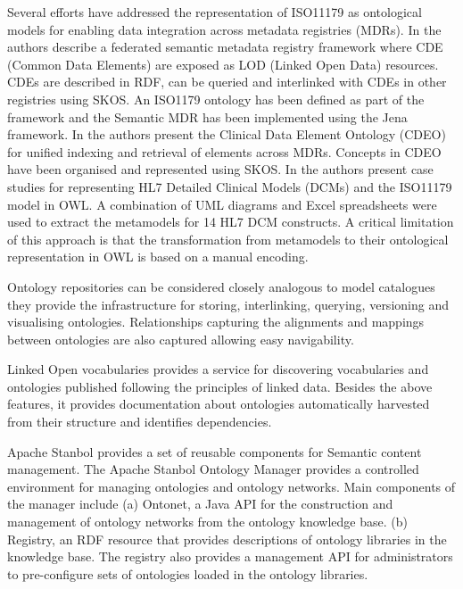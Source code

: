 


Several efforts have addressed the representation of ISO11179 as
ontological models for enabling data integration across metadata
registries (MDRs). In \cite{Sinaci2013784} the authors describe a
federated semantic metadata registry framework where CDE (Common Data
Elements) are exposed as LOD (Linked Open Data) resources. CDEs are
described in RDF, can be queried and interlinked with CDEs in other
registries using SKOS. An ISO1179 ontology has been defined as part of
the framework and the Semantic MDR has been implemented using the Jena
framework. In \cite{pmid25405066} the authors present the Clinical
Data Element Ontology (CDEO) for unified indexing and retrieval of
elements across MDRs. Concepts in CDEO have been organised and
represented using SKOS. In \cite{pmid22211181} the authors present
case studies for representing HL7 Detailed Clinical Models (DCMs) and
the ISO11179 model in OWL. A combination of UML diagrams and Excel
spreadsheets were used to extract the metamodels for 14 HL7 DCM
constructs. A critical limitation of this approach is that the
transformation from metamodels to their ontological representation in
OWL is based on a manual encoding.


Ontology repositories can be considered closely analogous to model
catalogues they provide the infrastructure for storing, interlinking,
querying, versioning and visualising ontologies. Relationships
capturing the alignments and mappings between ontologies are also
captured allowing easy navigability.

Linked Open vocabularies\cite{LOV} provides a service for discovering
vocabularies and ontologies published following the principles of
linked data. Besides the above features, it provides documentation
about ontologies automatically harvested from their structure and
identifies dependencies.

Apache Stanbol\cite{Stanbol} provides a set of reusable components for Semantic
content management.  The Apache Stanbol Ontology Manager provides a
controlled environment for managing ontologies and ontology
networks. Main components of the manager include (a) Ontonet, a Java
API for the construction and management of ontology networks from the
ontology knowledge base. (b) Registry, an RDF resource that provides
descriptions of ontology libraries in the knowledge base. The registry
also provides a management API for administrators to pre-configure
sets of ontologies loaded in the ontology libraries.

